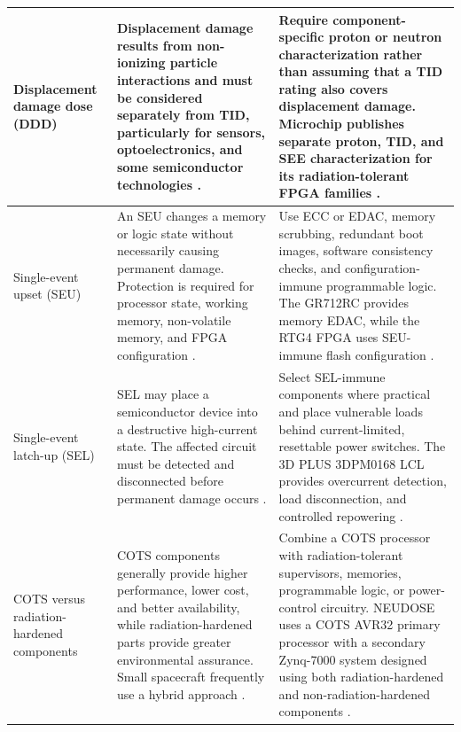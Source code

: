 \documentclass[10pt]{../datasheet}
\let\cite\citep
\begin{document}
\begin{longtable}{|p{3.5cm}|p{6.5cm}|p{6.5cm}|}
  Displacement damage dose (DDD)               &
  Displacement damage results from non-ionizing particle interactions and must
  be considered separately from TID, particularly for sensors, optoelectronics,
  and some semiconductor technologies
  \cite[p.~219]{nasa_soa_2022}
  \cite[p.~235]{nasa_soa_2023}
  \cite[pp.~240--241]{nasa_soa_2024}
  \cite[p.~221]{nasa_soa_2026}.                &
  Require component-specific proton or neutron characterization rather than
  assuming that a TID rating also covers displacement damage. Microchip
  publishes separate proton, TID, and SEE characterization for its
  radiation-tolerant FPGA families
  \cite{microchip_radiation_data}.                                          \\ \hline

  Single-event upset (SEU)                     &
  An SEU changes a memory or logic state without necessarily causing permanent
  damage. Protection is required for processor state, working memory,
  non-volatile memory, and FPGA configuration
  \cite[pp.~219--220]{nasa_soa_2022}
  \cite[pp.~235--236]{nasa_soa_2023}
  \cite[pp.~240--241]{nasa_soa_2024}
  \cite[pp.~221--222]{nasa_soa_2026}.          &
  Use ECC or EDAC, memory scrubbing, redundant boot images, software consistency
  checks, and configuration-immune programmable logic. The GR712RC provides
  memory EDAC, while the RTG4 FPGA uses SEU-immune flash configuration
  \cite{gaisler_gr712rc,microchip_rtg4}.                                    \\ \hline

  Single-event latch-up (SEL)                  &
  SEL may place a semiconductor device into a destructive high-current state.
  The affected circuit must be detected and disconnected before permanent damage
  occurs
  \cite[pp.~219--220]{nasa_soa_2022}
  \cite[pp.~235--236]{nasa_soa_2023}
  \cite[pp.~240--241]{nasa_soa_2024}
  \cite[pp.~221--222]{nasa_soa_2026}.          &
  Select SEL-immune components where practical and place vulnerable loads behind
  current-limited, resettable power switches. The 3D PLUS 3DPM0168 LCL provides
  overcurrent detection, load disconnection, and controlled repowering
  \cite{vorago_va41630,three_d_plus_protection_switch}.                     \\ \hline

  COTS versus radiation-hardened components    &
  COTS components generally provide higher performance, lower cost, and better
  availability, while radiation-hardened parts provide greater environmental
  assurance. Small spacecraft frequently use a hybrid approach
  \cite[p.~219]{nasa_soa_2022}
  \cite[p.~235]{nasa_soa_2023}
  \cite[p.~240]{nasa_soa_2024}
  \cite[pp.~221--222]{nasa_soa_2026}.          &
  Combine a COTS processor with radiation-tolerant supervisors, memories,
  programmable logic, or power-control circuitry. NEUDOSE uses a COTS AVR32
  primary processor with a secondary Zynq-7000 system designed using both
  radiation-hardened and non-radiation-hardened components
  \cite{neudose_obc_pub}.                                                   \\ \hline


\end{longtable}
\end{document}
